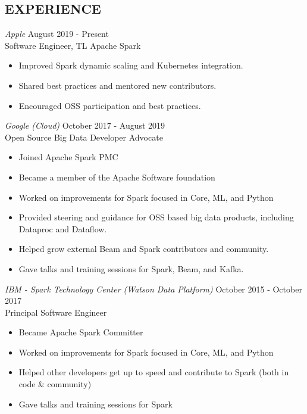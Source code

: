 \documentclass[10pt,line,margin=0.1]{newsres}
\begin{document}
\begin{resume}
\section{EXPERIENCE}
        {\sl Apple} \hfill August 2019 - Present\\
        Software Engineer, TL Apache Spark
        \begin{itemize}  \itemsep -2pt %
          \item Improved Spark dynamic scaling and Kubernetes integration.
          \item Shared best practices and mentored new contributors.
          \item Encouraged OSS participation and best practices.
        \end{itemize}                
        {\sl Google (Cloud)} \hfill October 2017 - August 2019\\
        Open Source Big Data Developer Advocate
        \begin{itemize}  \itemsep -2pt %
          \item Joined Apache Spark PMC
          \item Became a member of the Apache Software foundation
          \item Worked on improvements for Spark focused in Core, ML, and Python
          \item Provided steering and guidance for OSS based big data products, including Dataproc and Dataflow.
          \item Helped grow external Beam and Spark contributors and community.
          \item Gave talks and training sessions for Spark, Beam, and Kafka.
        \end{itemize}
            {\sl IBM - Spark Technology Center (Watson Data Platform)} \hfill October 2015 - October 2017\\
        Principal Software Engineer
        \begin{itemize}  \itemsep -2pt %
          \item Became Apache Spark Committer
          \item Worked on improvements for Spark focused in Core, ML, and Python
          \item Helped other developers get up to speed and contribute to Spark (both in code \& community)
          \item Gave talks and training sessions for Spark
        \end{itemize}

\end{resume}
\end{document}
